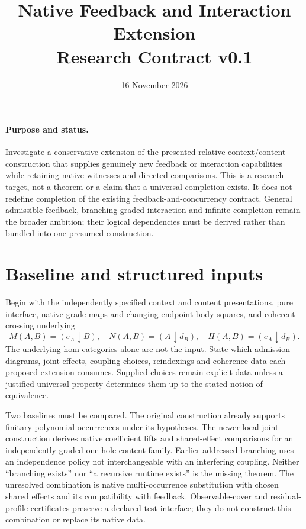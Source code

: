 \documentclass[11pt]{article}
\title{Native Feedback and Interaction Extension\\Research Contract v0.1}
\author{}\date{16 November 2026}
\begin{document}
\maketitle
\paragraph{Purpose and status.}
Investigate a conservative extension of the presented relative context/content construction that supplies genuinely new feedback or interaction capabilities while retaining native witnesses and directed comparisons. This is a research target, not a theorem or a claim that a universal completion exists. It does not redefine completion of the existing feedback-and-concurrency contract. General admissible feedback, branching graded interaction and infinite completion remain the broader ambition; their logical dependencies must be derived rather than bundled into one presumed construction.

\section{Baseline and structured inputs}
Begin with the independently specified context and content presentations, pure interface, native grade maps and changing-endpoint body squares, and coherent crossing underlying
\[
 M(A,B)=(e_A\downarrow B),\quad N(A,B)=(A\downarrow d_B),\quad H(A,B)=(e_A\downarrow d_B).
\]
The underlying hom categories alone are not the input. State which admission diagrams, joint effects, coupling choices, reindexings and coherence data each proposed extension consumes. Supplied choices remain explicit data unless a justified universal property determines them up to the stated notion of equivalence.

Two baselines must be compared. The original construction already supports finitary polynomial occurrences under its hypotheses. The newer local-joint construction derives native coefficient lifts and shared-effect comparisons for an independently graded one-hole content family. Earlier addressed branching uses an independence policy not interchangeable with an interfering coupling. Neither ``branching exists'' nor ``a recursive runtime exists'' is the missing theorem. The unresolved combination is native multi-occurrence substitution with chosen shared effects and its compatibility with feedback. Observable-cover and residual-profile certificates preserve a declared test interface; they do not construct this combination or replace its native data.
\end{document}
